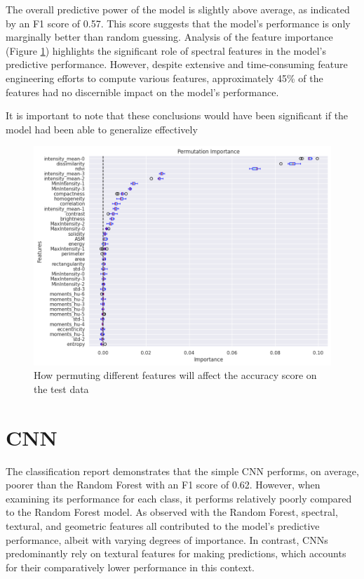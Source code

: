 The overall predictive power of the model is slightly above average, as indicated by an F1 score of 0.57. This score suggests that the model's performance is only marginally better than random guessing. Analysis of the feature importance (Figure \ref{fig:permuatation importance}) highlights the significant role of spectral features in the model's predictive performance. However, despite extensive and time-consuming feature engineering efforts to compute various features, approximately 45\% of the features had no discernible impact on the model's performance.

It is important to note that these conclusions would have been significant if the model had been able to generalize effectively
\begin{figure}[h]
    \centering
    \includegraphics[width=1\linewidth]{images/permutation imp.png}
    \caption{How permuting different features will affect the accuracy score on the test data}
    \label{fig:permuatation importance}
\end{figure}
\section{CNN}
The classification report demonstrates that the simple CNN performs, on average, poorer than the Random Forest with an F1 score of 0.62. However, when examining its performance for each class, it performs relatively poorly compared to the Random Forest model. As observed with the Random Forest, spectral, textural, and geometric features all contributed to the model's predictive performance, albeit with varying degrees of importance. In contrast, CNNs predominantly rely on textural features for making predictions, which accounts for their comparatively lower performance in this context.

